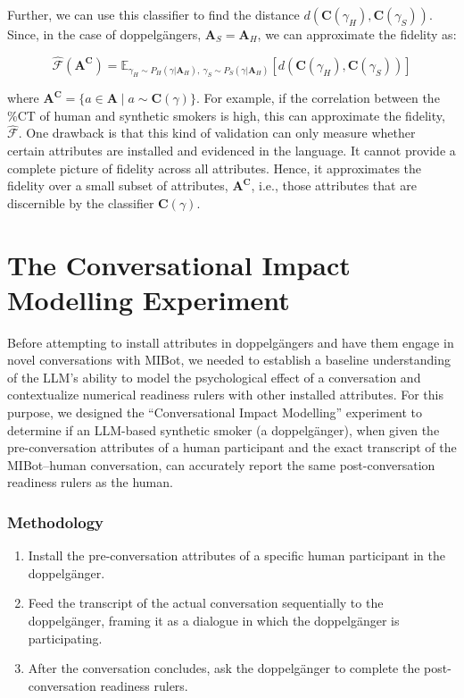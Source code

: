 Further, we can use this classifier to find the distance $d(\textbf{C}(\gamma_H), \textbf{C}(\gamma_S))$. Since, in the case of doppelgängers, $\textbf{A}_S = \textbf{A}_H$, we can approximate the fidelity as:

$$\hat{\mathcal{F}}(\textbf{A}^\textbf{C}) = \mathbb{E}_{\gamma_H \sim P_H (\gamma | \textbf{A}_H),  \:  \gamma_S \sim P_S(\gamma | \textbf{A}_H)}[d(
	\textbf{C}(\gamma_H),\textbf{C}(\gamma_S)
	)]$$


where $\textbf{A}^\textbf{C} = \{a \in \textbf{A} \mid a \sim \textbf{C}(\gamma)\}$. For example, if the correlation between the \%CT of human and synthetic smokers is high, this can approximate the fidelity, $\hat{\mathcal{F}}$. One drawback is that this kind of validation can only measure whether certain attributes are installed and evidenced in the language. It cannot provide a complete picture of fidelity across all attributes. Hence, it approximates the fidelity over a small subset of attributes, $\textbf{A}^\textbf{C}$, i.e., those attributes that are discernible by the classifier $\textbf{C}(\gamma)$.



\section{The Conversational Impact Modelling Experiment}
\label{sec:transcript-autoplay}

Before attempting to install attributes in doppelgängers and have them engage in novel conversations with MIBot, we needed to establish a baseline understanding of the LLM's ability to model the psychological effect of a conversation and contextualize numerical readiness rulers with other installed attributes. For this purpose, we designed the ``Conversational Impact Modelling'' experiment to determine if an LLM-based synthetic smoker (a doppelgänger), when given the pre-conversation attributes of a human participant and the exact transcript of the MIBot--human conversation, can accurately report the same post-conversation readiness rulers as the human.

\subsubsection{Methodology}
\begin{enumerate}
	\item Install the pre-conversation attributes of a specific human participant in the doppelgänger.
	\item Feed the transcript of the actual conversation sequentially to the doppelgänger, framing it as a dialogue in which the doppelgänger is participating.
	\item After the conversation concludes, ask the doppelgänger to complete the post-conversation readiness rulers.
\end{enumerate}

